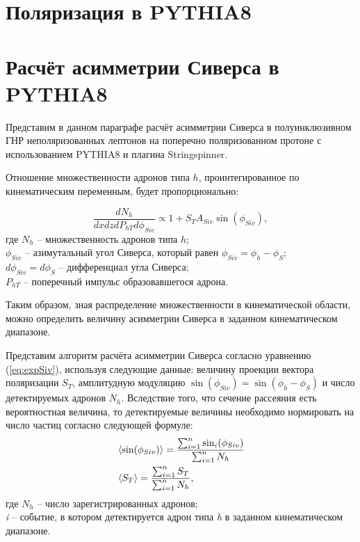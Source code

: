\documentclass{extreport}
\begin{document}
\newpage 

\section{Поляризация в PYTHIA8}
\section{Расчёт асимметрии Сиверса в PYTHIA8}

Представим в данном параграфе расчёт асимметрии Сиверса в полуинклюзивном ГНР неполяризованных лептонов на поперечно поляризованном протоне с использованием PYTHIA8 и плагина Stringspinner.  


Отношение множественности адронов типа $h$, проинтегированное по кинематическим переменным, будет пропорционально:

\begin{equation}
	\label{eq:expSiv}
	\frac{dN_h}{dxdzdP_{hT}d\phi_{Siv}} \propto 1 + S_T A_{Siv} \sin (\phi_{Siv}),
\end{equation}
где $N_h$ -- множественность адронов типа $h$; \\
$\phi_{Siv}$ -- азимутальный угол Сиверса, который равен $\phi_{Siv} = \phi_{h} - \phi_S$; \\
$d\phi_{Siv} = d\phi_S$ -- дифференциал угла Сиверса; \\
$P_{hT}$ -- поперечный импульс образовавшегося адрона.

Таким образом, зная распределение множественности в кинематической области, можно определить величину асимметрии Сиверса в заданном кинематическом диапазоне. 

Представим алгоритм расчёта асимметрии Сиверса согласно уравнению (\ref{eq:expSiv}), используя следующие данные: величину проекции вектора поляризации $S_T$, амплитудную модуляцию $\sin (\phi_{Siv}) = \sin (\phi_{h} - \phi_S)$ и число детектируемых адронов $N_h$. Вследствие того, что сечение рассеяния есть вероятностная величина, то детектируемые величины необходимо нормировать на число частиц согласно следующей формуле:
\begin{equation}
	\begin{split}
		& \braket{\sin (\phi_{Siv})} = \frac{\sum_{i=1}^{n}\sin_i (\phi_{Siv})}{\sum_{i=1}^{n} N_h} \\
		& \braket{S_T} = \frac{\sum_{i=1}^{n}S_T}{\sum_{i=1}^{n} N_h},
	\end{split}
\end{equation}
где $N_h$ -- число зарегистрированных адронов; \\ \textit{i} -- событие, в котором детектируется адрон типа \textit{h} в заданном кинематическом диапазоне.
\end{document}
